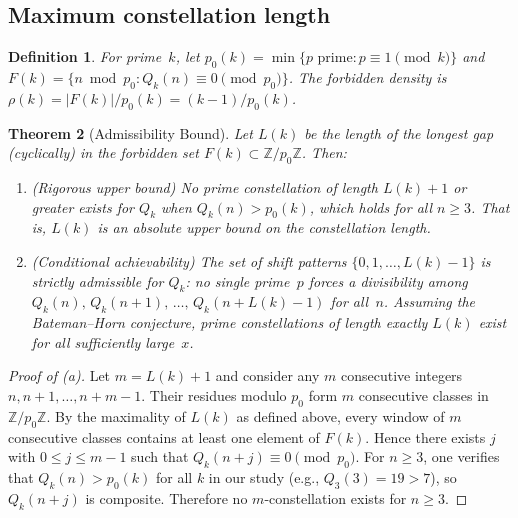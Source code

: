\documentclass[11pt,a4paper]{article}
\newtheorem{theorem}{Theorem}[section]
\newtheorem{definition}[theorem]{Definition}
\newcommand{\Qk}{Q_k}
\newcommand{\ZZ}{\mathbb{Z}}
\begin{document}
\subsection{Maximum constellation length}

\begin{definition}\label{def:density}
For prime~$k$, let $p_0(k) = \min\{p \text{ prime} : p \equiv 1 \pmod{k}\}$ and $F(k) = \{n \bmod p_0 : \Qk(n) \equiv 0 \pmod{p_0}\}$. The \emph{forbidden density} is $\rho(k) = |F(k)|/p_0(k) = (k-1)/p_0(k)$.
\end{definition}

\begin{theorem}[Admissibility Bound]\label{thm:admissibility}
Let $L(k)$ be the length of the longest gap (cyclically) in the forbidden set $F(k) \subset \ZZ/p_0\ZZ$. Then:

\begin{enumerate}[label=\textup{(\alph*)},leftmargin=2em]
\item \textup{(Rigorous upper bound)} No prime constellation of length $L(k)+1$ or greater exists for $\Qk$ when $\Qk(n) > p_0(k)$, which holds for all $n \ge 3$. That is, $L(k)$ is an absolute upper bound on the constellation length.

\item \textup{(Conditional achievability)} The set of shift patterns $\{0, 1, \ldots, L(k)-1\}$ is strictly admissible for $\Qk$: no single prime~$p$ forces a divisibility among $\Qk(n),\, \Qk(n+1),\, \ldots,\, \Qk(n+L(k)-1)$ for all~$n$. Assuming the Bateman--Horn conjecture, prime constellations of length exactly $L(k)$ exist for all sufficiently large~$x$.
\end{enumerate}
\end{theorem}

\begin{proof}[Proof of \textup{(a)}]
Let $m = L(k) + 1$ and consider any $m$ consecutive integers $n, n+1, \ldots, n+m-1$. Their residues modulo $p_0$ form $m$ consecutive classes in $\ZZ/p_0\ZZ$. By the maximality of $L(k)$ as defined above, every window of $m$ consecutive classes contains at least one element of $F(k)$. Hence there exists $j$ with $0 \le j \le m-1$ such that $\Qk(n+j) \equiv 0 \pmod{p_0}$. For $n \ge 3$, one verifies that $\Qk(n) > p_0(k)$ for all $k$ in our study (e.g., $Q_3(3) = 19 > 7$), so $\Qk(n+j)$ is composite. Therefore no $m$-constellation exists for $n \ge 3$.
\end{proof}
\end{document}
